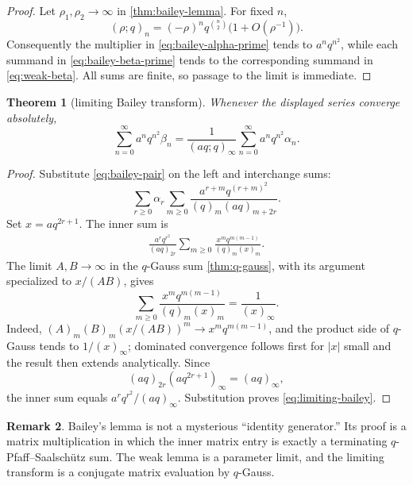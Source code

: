 \documentclass[11pt,oneside]{article}
\newtheorem{theorem}{Theorem}[section]
\theoremstyle{definition}
\newtheorem{remark}[theorem]{Remark}
\begin{document}
\begin{proof}
Let $\rho_1,\rho_2\to\infty$ in \cref{thm:bailey-lemma}.  For fixed $n$,
\[
 (\rho;q)_n=(-\rho)^nq^{\binom n2}\bigl(1+O(\rho^{-1})\bigr).
\]
Consequently the multiplier in \eqref{eq:bailey-alpha-prime} tends to
$a^nq^{n^2}$, while each summand in \eqref{eq:bailey-beta-prime} tends
to the corresponding summand in \eqref{eq:weak-beta}.  All sums are
finite, so passage to the limit is immediate.
\end{proof}

\begin{theorem}[limiting Bailey transform]\label{thm:limiting-bailey}
Whenever the displayed series converge absolutely,
\begin{equation}\label{eq:limiting-bailey}
 \sum_{n=0}^{\infty}a^nq^{n^2}\beta_n
 =
 \frac1{(aq;q)_\infty}
 \sum_{n=0}^{\infty}a^nq^{n^2}\alpha_n.
\end{equation}
\end{theorem}

\begin{proof}
Substitute \eqref{eq:bailey-pair} on the left and interchange sums:
\[
 \sum_{r\ge0}\alpha_r
 \sum_{m\ge0}
 \frac{a^{r+m}q^{(r+m)^2}}
 {(q)_m(aq)_{m+2r}}.
\]
Set $x=aq^{2r+1}$.  The inner sum is
\begin{align*}
 \frac{a^rq^{r^2}}{(aq)_{2r}}
 \sum_{m\ge0}
 \frac{x^mq^{m(m-1)}}{(q)_m(x)_m}.
\end{align*}
The limit $A,B\to\infty$ in the $q$-Gauss sum
\cref{thm:q-gauss}, with its argument specialized to $x/(AB)$, gives
\begin{equation}\label{eq:gauss-infinite-limit}
 \sum_{m\ge0}\frac{x^mq^{m(m-1)}}{(q)_m(x)_m}
 =\frac1{(x)_\infty}.
\end{equation}
Indeed, $(A)_m(B)_m(x/(AB))^m\to x^mq^{m(m-1)}$, and the product side
of $q$-Gauss tends to $1/(x)_\infty$; dominated convergence follows
first for $|x|$ small and the result then extends analytically.
Since
\[
 (aq)_{2r}(aq^{2r+1})_\infty=(aq)_\infty,
\]
the inner sum equals $a^rq^{r^2}/(aq)_\infty$.  Substitution proves
\eqref{eq:limiting-bailey}.
\end{proof}

\begin{remark}
Bailey's lemma is not a mysterious ``identity generator.''  Its proof is
a matrix multiplication in which the inner matrix entry is exactly a
terminating $q$-Pfaff--Saalsch\"utz sum.  The weak lemma is a parameter
limit, and the limiting transform is a conjugate matrix evaluation by
$q$-Gauss.
\end{remark}
\end{document}
